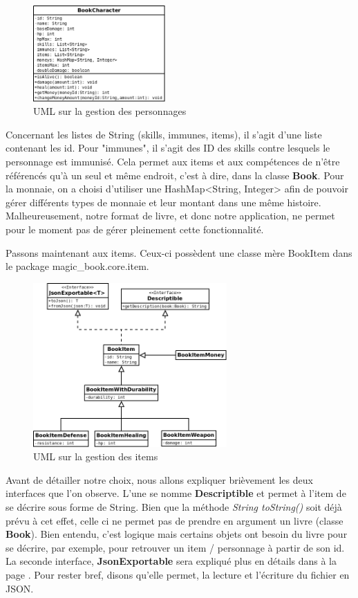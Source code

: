 			\begin{figure}[H]
				\centering\includegraphics[width=0.45\textwidth, keepaspectratio]{img/book_character.png}
				\caption{UML sur la gestion des personnages}
			\end{figure}

			Concernant les listes de String (skills, immunes, items), il s'agit d'une liste contenant les id. Pour "immunes", il s'agit des ID des skills contre lesquels le personnage est immunisé. Cela permet aux items et aux compétences de n'être référencés qu'à un seul et même endroit, c'est à dire, dans la classe \textbf{Book}. Pour la monnaie, on a choisi d'utiliser une HashMap<String, Integer> afin de pouvoir gérer différents types de monnaie et leur montant dans une même histoire. Malheureusement, notre format de livre, et donc notre application, ne permet pour le moment pas de gérer pleinement cette fonctionnalité.

			Passons maintenant aux items. Ceux-ci possèdent une classe mère BookItem dans le package magic\_book.core.item.

			\begin{figure}[H]
				\centering\includegraphics[width=0.66\textwidth, keepaspectratio]{img/book_item.png}
				\caption{UML sur la gestion des items}
			\end{figure}

			Avant de détailler notre choix, nous allons expliquer brièvement les deux interfaces que l'on observe. L'une se nomme \textbf{Descriptible} et permet à l'item de se décrire sous forme de String. Bien que la méthode \textit{String toString()} soit déjà prévu à cet effet, celle ci ne permet pas de prendre en argument un livre (classe \textbf{Book}). Bien entendu, c'est logique mais certains objets ont besoin du livre pour se décrire, par exemple, pour retrouver un item / personnage à partir de son id. La seconde interface, \textbf{JsonExportable} sera expliqué plus en détails dans  à la page \pageref{subsec:lecture_ecriture_fichier}. Pour rester bref, disons qu'elle permet, la lecture et l'écriture du fichier en JSON.

